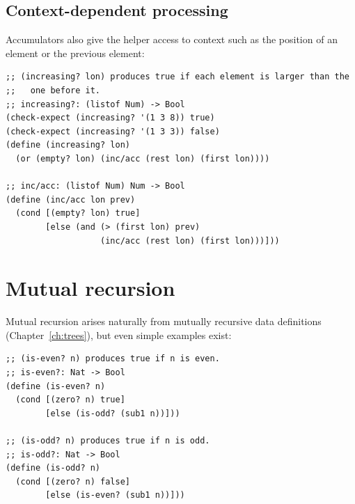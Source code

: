 \subsection{Context-dependent processing}
Accumulators also give the helper access to context such as the position of an
element or the previous element:
\begin{lstlisting}[style=racket]
;; (increasing? lon) produces true if each element is larger than the
;;   one before it.
;; increasing?: (listof Num) -> Bool
(check-expect (increasing? '(1 3 8)) true)
(check-expect (increasing? '(1 3 3)) false)
(define (increasing? lon)
  (or (empty? lon) (inc/acc (rest lon) (first lon))))

;; inc/acc: (listof Num) Num -> Bool
(define (inc/acc lon prev)
  (cond [(empty? lon) true]
        [else (and (> (first lon) prev)
                   (inc/acc (rest lon) (first lon)))]))
\end{lstlisting}

\section{Mutual recursion}

Mutual recursion arises naturally from mutually recursive data definitions
(Chapter~\ref{ch:trees}), but even simple examples exist:

\begin{lstlisting}[style=racket]
;; (is-even? n) produces true if n is even.
;; is-even?: Nat -> Bool
(define (is-even? n)
  (cond [(zero? n) true]
        [else (is-odd? (sub1 n))]))

;; (is-odd? n) produces true if n is odd.
;; is-odd?: Nat -> Bool
(define (is-odd? n)
  (cond [(zero? n) false]
        [else (is-even? (sub1 n))]))
\end{lstlisting}

